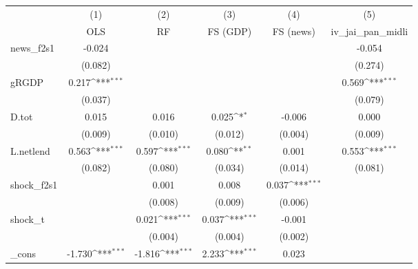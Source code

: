 {
\def\sym#1{\ifmmode^{#1}\else\(^{#1}\)\fi}
\begin{tabular}{l*{5}{c}}
\toprule
            &\multicolumn{1}{c}{(1)}&\multicolumn{1}{c}{(2)}&\multicolumn{1}{c}{(3)}&\multicolumn{1}{c}{(4)}&\multicolumn{1}{c}{(5)}\\
            &\multicolumn{1}{c}{OLS}&\multicolumn{1}{c}{RF}&\multicolumn{1}{c}{FS (GDP)}&\multicolumn{1}{c}{FS (news)}&\multicolumn{1}{c}{iv\_jai\_pan\_midli}\\
\midrule
news\_f2s1   &      -0.024         &                     &                     &                     &      -0.054         \\
            &     (0.082)         &                     &                     &                     &     (0.274)         \\
\addlinespace
gRGDP       &       0.217\sym{***}&                     &                     &                     &       0.569\sym{***}\\
            &     (0.037)         &                     &                     &                     &     (0.079)         \\
\addlinespace
D.tot       &       0.015         &       0.016         &       0.025\sym{*}  &      -0.006         &       0.000         \\
            &     (0.009)         &     (0.010)         &     (0.012)         &     (0.004)         &     (0.009)         \\
\addlinespace
L.netlend   &       0.563\sym{***}&       0.597\sym{***}&       0.080\sym{**} &       0.001         &       0.553\sym{***}\\
            &     (0.082)         &     (0.080)         &     (0.034)         &     (0.014)         &     (0.081)         \\
\addlinespace
shock\_f2s1  &                     &       0.001         &       0.008         &       0.037\sym{***}&                     \\
            &                     &     (0.008)         &     (0.009)         &     (0.006)         &                     \\
\addlinespace
shock\_t     &                     &       0.021\sym{***}&       0.037\sym{***}&      -0.001         &                     \\
            &                     &     (0.004)         &     (0.004)         &     (0.002)         &                     \\
\addlinespace
\_cons      &      -1.730\sym{***}&      -1.816\sym{***}&       2.233\sym{***}&       0.023         &                     \\

\end{tabular}}
